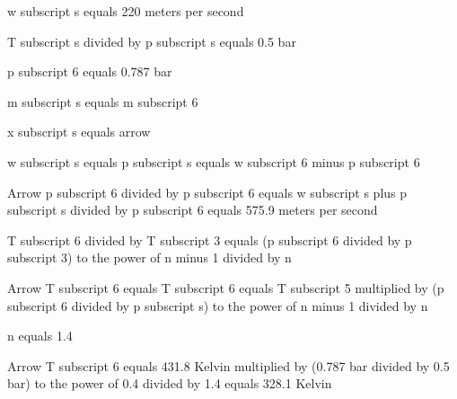 w subscript s equals 220 meters per second

T subscript s divided by p subscript s equals 0.5 bar

p subscript 6 equals 0.787 bar

m subscript s equals m subscript 6

x subscript s equals arrow

w subscript s equals p subscript s equals w subscript 6 minus p subscript 6

Arrow p subscript 6 divided by p subscript 6 equals w subscript s plus p subscript s divided by p subscript 6 equals 575.9 meters per second

T subscript 6 divided by T subscript 3 equals (p subscript 6 divided by p subscript 3) to the power of n minus 1 divided by n

Arrow T subscript 6 equals T subscript 6 equals T subscript 5 multiplied by (p subscript 6 divided by p subscript s) to the power of n minus 1 divided by n

n equals 1.4

Arrow T subscript 6 equals 431.8 Kelvin multiplied by (0.787 bar divided by 0.5 bar) to the power of 0.4 divided by 1.4 equals 328.1 Kelvin
